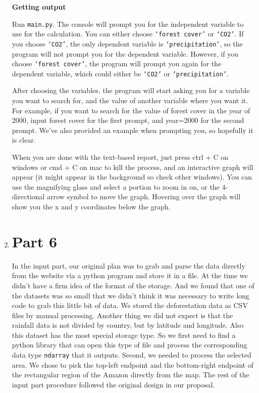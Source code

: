 \documentclass[12pt]{article}
\begin{document}
\begin{enumerate}
\begin{text}
\textbf{Getting output}

Run \texttt{main.py}. The console will prompt you for the independent variable to use for the calculation. You can either choose \texttt{`forest cover'} or \texttt{`CO2'}. If you choose \texttt{`CO2'}, the only dependent variable is \texttt{`precipitation'}, so the program will not prompt you for the dependent variable. However, if you choose \texttt{`forest cover'}, the program will prompt you again for the dependent variable, which could either be \texttt{`CO2'} or \texttt{`precipitation'}.

After choosing the variables, the program will start asking you for a variable you want to search for, and the value of another variable where you want it. For example, if you want to search for the value of forest cover in the year of 2000, input forest cover for the first prompt, and year=2000 for the second prompt. We've also provided an example when prompting you, so hopefully it is clear.

When you are done with the text-based report, just press ctrl + C on windows or cmd + C on mac to kill the process, and an interactive graph will appear (it might appear in the background so check other windows). You can use the magnifying glass and select a portion to zoom in on, or the 4-directional arrow symbol to move the graph. Hovering over the graph will show you the x and y coordinates below the graph.

\end{text}



\newpage

\item \section*{Part 6}

\begin{text}

In the input part, our original plan was to grab and parse the data directly from the website via a python program and store it in a file. At the time we didn't have a firm idea of the format of the storage. And we found that one of the datasets was so small that we didn't think it was necessary to write long code to grab this little bit of data. We stored the deforestation data as CSV files by manual processing. Another thing we did not expect is that the rainfall data is not divided by country, but by latitude and longitude. Also this dataset has the most special storage type. So we first need to find a python library that can open this type of file and process the corresponding data type \texttt{ndarray} that it outputs\citep{Pynpy}. Second, we needed to process the selected area. We chose to pick the top-left endpoint and the bottom-right endpoint of the rectangular region of the Amazon directly from the map. The rest of the input part procedure followed the original design in our proposal.


\end{text}
\end{enumerate}
\end{document}
